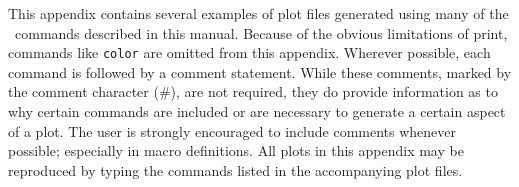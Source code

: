 %
%

This appendix contains several examples of plot files generated using
many of the \wip\ commands described in this manual.
Because of the obvious limitations of print, commands like {\tt color} are
omitted from this appendix.
Wherever possible, each command is followed by a comment statement.
While these comments, marked by the comment
character (\#),
are not required, they do provide information as to why certain commands
are included or are necessary to generate a certain aspect of a plot.
The user is strongly encouraged to include comments whenever possible;
especially in macro definitions.
All plots in this appendix may be reproduced by typing the commands
listed in the accompanying plot files.

